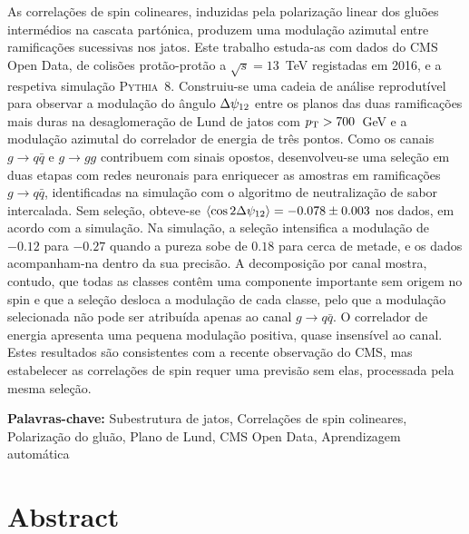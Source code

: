 \documentclass{istdissertacao}
\begin{document}
As correlações de spin colineares, induzidas pela polarização linear dos gluões
intermédios na cascata partónica, produzem uma modulação azimutal entre
ramificações sucessivas nos jatos. Este trabalho estuda-as com dados do CMS Open
Data, de colisões protão-protão a $\sqrt{s} = 13$~TeV registadas em 2016, e a
respetiva simulação \textsc{Pythia}~8. Construiu-se uma cadeia de análise
reprodutível para observar a modulação do ângulo $\Delta\psi_{12}$ entre os planos das duas
ramificações mais duras na desaglomeração de Lund de jatos com $p_{\mathrm{T}} > 700$~GeV e a
modulação azimutal do correlador de energia de três pontos. Como os canais
$g \to q\bar{q}$ e $g \to gg$ contribuem com sinais opostos, desenvolveu-se uma
seleção em duas etapas com redes neuronais para enriquecer as amostras em
ramificações $g \to q\bar{q}$, identificadas na simulação com o algoritmo de
neutralização de sabor intercalada. Sem seleção, obteve-se
$\langle \cos 2\Delta\psi_{12} \rangle = -0.078 \pm 0.003$ nos dados, em acordo com a
simulação. Na simulação, a seleção intensifica a modulação de $-0.12$ para
$-0.27$ quando a pureza sobe de $0.18$ para cerca de metade, e os dados
acompanham-na dentro da sua precisão. A decomposição por canal mostra, contudo,
que todas as classes contêm uma componente importante sem origem no spin e que a
seleção desloca a modulação de cada classe, pelo que a modulação selecionada não
pode ser atribuída apenas ao canal $g \to q\bar{q}$. O correlador de energia
apresenta uma pequena modulação positiva, quase insensível ao canal. Estes
resultados são consistentes com a recente observação do CMS, mas estabelecer as
correlações de spin requer uma previsão sem elas, processada pela mesma seleção.

\vspace{1em}
\textbf{Palavras-chave:} Subestrutura de jatos, Correlações de spin
colineares, Polarização do gluão, Plano de Lund, CMS Open Data, Aprendizagem
automática

\cleardoublepage
{}
\chapter*{Abstract}
\end{document}
